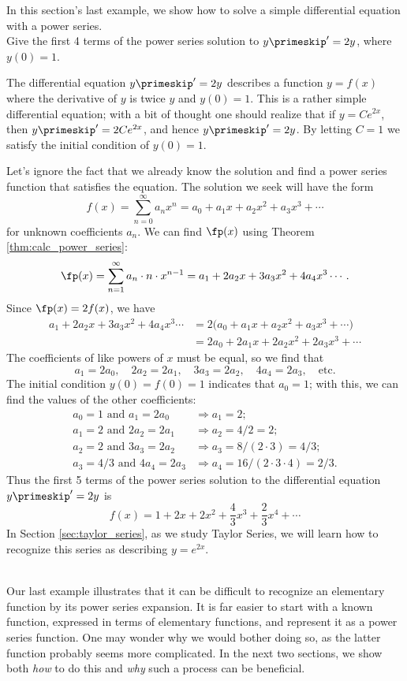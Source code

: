 In this section's last example, we show how to solve a simple differential equation with a power series.\\

{Give the first 4 terms of the power series solution to $y\primeskip' = 2y$, where $y(0) = 1$.
}
{The differential equation $y\primeskip' = 2y$ describes a function $y=f(x)$ where the derivative of $y$ is twice $y$ and $y(0)=1$. This is a rather simple differential equation; with a bit of thought one should realize that if $y=Ce^{2x}$, then $y\primeskip' = 2Ce^{2x}$, and hence $y\primeskip' = 2y$. By letting $C=1$ we satisfy the initial condition of $y(0)=1$.

Let's ignore the fact that we already know the solution and find a power series function that satisfies the equation. The solution we seek will have the form
$$f(x)  = \sum_{n=0}^\infty a_nx^n = a_0+a_1x+a_2x^2+a_3x^3+\cdots$$
for unknown coefficients $a_n$. We can find $\fp(x)$ using Theorem \ref{thm:calc_power_series}:
$$\fp(x) = \sum_{n=1}^\infty a_n\cdot n\cdot x^{n-1} = a_1+2a_2x+3a_3x^2+4a_4x^3\cdots.$$
Since $\fp(x) = 2f(x)$, we have
\begin{align*}
a_1+2a_2x+3a_3x^2+4a_4x^3\cdots &= 2\big(a_0+a_1x+a_2x^2+a_3x^3+\cdots\big)\\
			&=2a_0+2a_1x+2a_2x^2+2a_3x^3+\cdots
\end{align*}
The coefficients of like powers of $x$ must be equal, so we find that
$$a_1 = 2a_0,\quad 2a_2 = 2a_1,\quad 3a_3 = 2a_2,\quad 4a_4 = 2a_3,\quad \text{etc.}$$
The initial condition $y(0) = f(0) = 1$ indicates that $a_0 = 1$; with this, we can find the values of the other coefficients:
\begin{align*}
a_0 = 1 \text{ and } a_1=2a_0 &\Rightarrow a_1 = 2;\\
a_1 = 2 \text{ and } 2a_2 = 2a_1 &\Rightarrow a_2=4/2 =2;\\
a_2=2 \text{ and } 3a_3 = 2a_2 &\Rightarrow a_3=8/(2\cdot3)=4/3;\\
a_3=4/3 \text{ and } 4a_4 = 2a_3 &\Rightarrow a_4 =16/(2\cdot3\cdot4)= 2/3. 
\end{align*}
Thus the first 5 terms of the power series solution to the differential equation $y\primeskip'=2y$ is 
$$f(x) = 1+ 2x+2x^2 + \frac43x^3+\frac23x^4+\cdots$$
In Section \ref{sec:taylor_series}, as we study Taylor Series, we will learn how to recognize this series as describing $y=e^{2x}$. 
}\\

Our last example illustrates that it can be difficult to recognize an elementary function by its power series expansion. It is far easier to start with a known function, expressed in terms of elementary functions, and represent it as a power series function. One may wonder why we would bother doing so, as the latter function probably seems more complicated. In the next two sections, we show both \emph{how} to do this and  \emph{why} such a process can be beneficial. 

